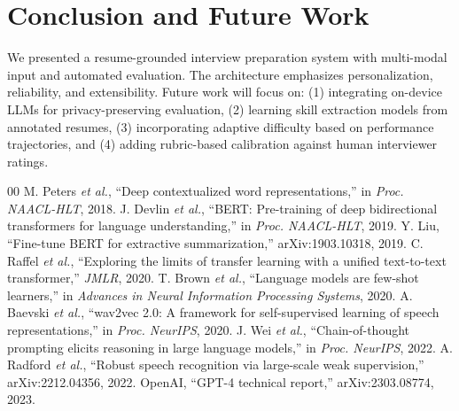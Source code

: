 \documentclass[conference]{IEEEtran}
\begin{document}
\section{Conclusion and Future Work}
We presented a resume-grounded interview preparation system with multi-modal input and automated evaluation. The architecture emphasizes personalization, reliability, and extensibility. Future work will focus on: (1) integrating on-device LLMs for privacy-preserving evaluation, (2) learning skill extraction models from annotated resumes, (3) incorporating adaptive difficulty based on performance trajectories, and (4) adding rubric-based calibration against human interviewer ratings.

\begin{thebibliography}{00}
 M. Peters \emph{et al.}, ``Deep contextualized word representations,'' in \emph{Proc. NAACL-HLT}, 2018.
 J. Devlin \emph{et al.}, ``BERT: Pre-training of deep bidirectional transformers for language understanding,'' in \emph{Proc. NAACL-HLT}, 2019.
 Y. Liu, ``Fine-tune BERT for extractive summarization,'' arXiv:1903.10318, 2019.
 C. Raffel \emph{et al.}, ``Exploring the limits of transfer learning with a unified text-to-text transformer,'' \emph{JMLR}, 2020.
 T. Brown \emph{et al.}, ``Language models are few-shot learners,'' in \emph{Advances in Neural Information Processing Systems}, 2020.
 A. Baevski \emph{et al.}, ``wav2vec 2.0: A framework for self-supervised learning of speech representations,'' in \emph{Proc. NeurIPS}, 2020.
 J. Wei \emph{et al.}, ``Chain-of-thought prompting elicits reasoning in large language models,'' in \emph{Proc. NeurIPS}, 2022.
 A. Radford \emph{et al.}, ``Robust speech recognition via large-scale weak supervision,'' arXiv:2212.04356, 2022.
 OpenAI, ``GPT-4 technical report,'' arXiv:2303.08774, 2023.
\end{thebibliography}
\end{document}
